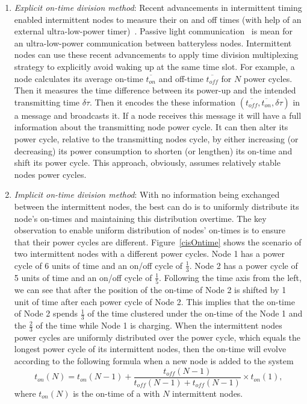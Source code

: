 \begin{enumerate}[wide, labelwidth=!, labelindent=0pt]
%
		\item \textit{Explicit on-time division method}: Recent advancements in intermittent timing enabled intermittent nodes to measure their on and off times (with help of an external ultra-low-power timer)~\cite{mayfly2017hester}. Passive light communication~\cite{marco} is mean for an ultra-low-power communication between batteryless nodes. Intermittent nodes can use these recent advancements to apply time division multiplexing strategy to explicitly avoid waking up at the same time slot. For example, a node calculates its average on-time $\overline{t_{on}}$ and off-time $\overline{t_{off}}$ for $N$ power cycles. Then it measures the time difference between its power-up and the intended transmitting time $\delta\tau$. Then it encodes the these information $({\overline{t_{off}}, \overline{t_{on}}, \delta\tau})$ in a message and broadcasts it. If a node receives this message it will have a full information about the transmitting node power cycle. It can then alter its power cycle, relative to the transmitting nodes cycle, by either increasing (or decreasing) its power consumption to shorten (or lengthen) its on-time and shift its power cycle. This approach, obviously, assumes relatively stable nodes power cycles. 
%
%
		\item \textit{Implicit on-time division method}: With no information being exchanged between the intermittent nodes, the best \sys can do is to uniformly distribute its node's on-times and maintaining this distribution overtime. The key observation to enable uniform distribution of nodes' on-times is to ensure that their power cycles are different. Figure~\ref{cisOntime} shows the scenario of two intermittent nodes with a different power cycles. Node 1 has a power cycle of 6 units of time and an on/off cycle of $\frac{1}{3}$. Node 2 has a power cycle of 5 units of time and an on/off cycle of $\frac{1}{5}$. Following the time axis from the left, we can see that after the position of the on-time of Node 2 is shifted by 1 unit of time after each power cycle of Node 2. This implies that the on-time of Node 2 spends $\frac{1}{3}$ of the time clustered under the on-time of the Node 1 and the $\frac{2}{3}$ of the time while Node 1 is charging. When the intermittent nodes power cycles are uniformly distributed over the \sys power cycle, which equals the longest power cycle of its intermittent nodes, then the \sys on-time will evolve according to the following formula when a new node is added to the system
$$
	t_{on}(N) = t_{on}(N-1) + \frac{t_{off}(N-1)}{t_{off}(N-1)+t_{off}(N-1)} \times t_{on}(1),
$$
				where $t_{on}(N)$ is the on-time of a \sys with $N$ intermittent nodes.
\end{enumerate}
